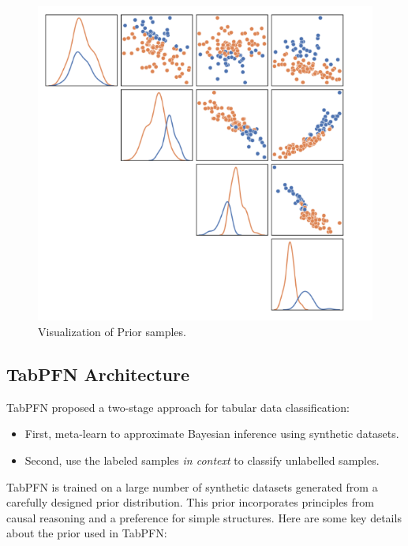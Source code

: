 \documentclass[a4paper]{article}
\begin{document}
\begin{figure}[!ht]
  \centering
  \includegraphics[width=0.4\linewidth]{figures/priors_visualized.png}
  \caption{\label{fig:priors} Visualization of Prior samples.}
  \end{figure}

\subsection{TabPFN Architecture}\label{subsec1}

TabPFN proposed a two-stage approach for tabular data classification:
\begin{itemize}
  \item First, meta-learn to approximate Bayesian inference using synthetic datasets.
  \item Second, use the labeled samples \textit{in context} to classify unlabelled samples.
\end{itemize}

TabPFN is trained on a large number of synthetic datasets generated from a carefully designed prior distribution. This prior incorporates principles from causal reasoning and a preference for simple structures. Here are some key details about the prior used in TabPFN:
\end{document}
